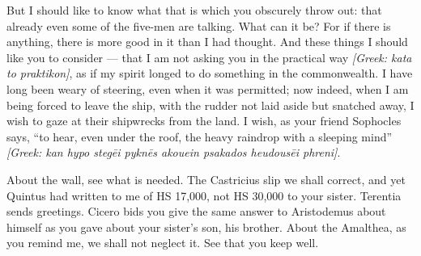  But I should like to know what that is which you obscurely throw out: that already even some of the five-men are talking. What can it be? For if there is anything, there is more good in it than I had thought. And these things I should like you to consider --- that I am not asking you in the practical way \textit{[Greek: kata to praktikon]}, as if my spirit longed to do something in the commonwealth. I have long been weary of steering, even when it was permitted; now indeed, when I am being forced to leave the ship, with the rudder not laid aside but snatched away, I wish to gaze at their shipwrecks from the land. I wish, as your friend Sophocles says, ``to hear, even under the roof, the heavy raindrop with a sleeping mind'' \textit{[Greek: kan hypo steg\=ei pykn\=es akouein psakados heudous\=ei phreni]}.

 About the wall, see what is needed. The Castricius slip we shall correct, and yet Quintus had written to me of HS 17,000, not HS 30,000 to your sister. Terentia sends greetings. Cicero bids you give the same answer to Aristodemus about himself as you gave about your sister's son, his brother. About the Amalthea, as you remind me, we shall not neglect it. See that you keep well.
